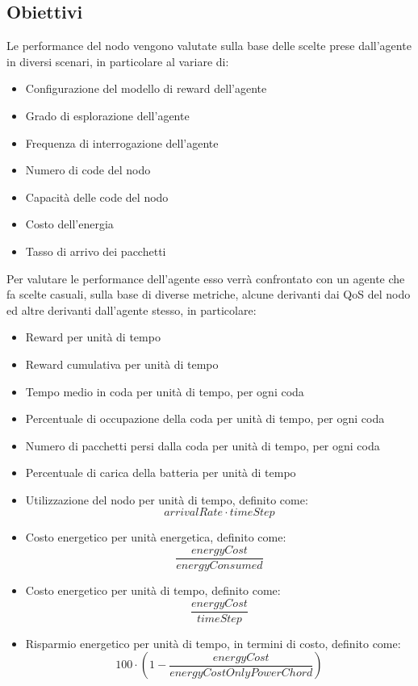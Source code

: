 \documentclass[conference]{IEEEtran}
\begin{document}
\subsection{Obiettivi}
Le performance del nodo vengono valutate sulla base delle scelte prese dall'agente in diversi scenari, in particolare al variare di:
\begin{itemize}
    \item Configurazione del modello di reward dell'agente
    \item Grado di esplorazione dell'agente
    \item Frequenza di interrogazione dell'agente
    \item Numero di code del nodo
    \item Capacità delle code del nodo
    \item Costo dell'energia
    \item Tasso di arrivo dei pacchetti
\end{itemize}

Per valutare le performance dell'agente esso verrà confrontato con un agente che fa scelte casuali, sulla base di diverse metriche, alcune derivanti dai QoS del nodo ed altre derivanti dall'agente stesso, in particolare:
\begin{itemize}
    \item Reward per unità di tempo
    \item Reward cumulativa per unità di tempo
    \item Tempo medio in coda per unità di tempo, per ogni coda
    \item Percentuale di occupazione della coda per unità di tempo, per ogni coda
    \item Numero di pacchetti persi dalla coda per unità di tempo, per ogni coda
    \item Percentuale di carica della batteria per unità di tempo
    \item Utilizzazione del nodo per unità di tempo, definito come:  
    \begin{equation}
        \label{eq:utilization_eq} 
        {arrivalRate}\cdot{timeStep}
    \end{equation}
    \item Costo energetico per unità energetica, definito come: 
    \begin{equation}
        \label{eq:cexue_eq} 
        \frac{energyCost}{energyConsumed}
    \end{equation}
    \item Costo energetico per unità di tempo, definito come: 
    \begin{equation}
        \label{eq:cexut_eq}
        \frac{energyCost}{timeStep}
    \end{equation}
    \item Risparmio energetico per unità di tempo, in termini di costo, definito come: 
    \begin{equation}
        \label{eq:re_eq}
    100\cdot(1-\frac{energyCost}{energyCostOnlyPowerChord})
    \end{equation}
\end{itemize}
\end{document}

